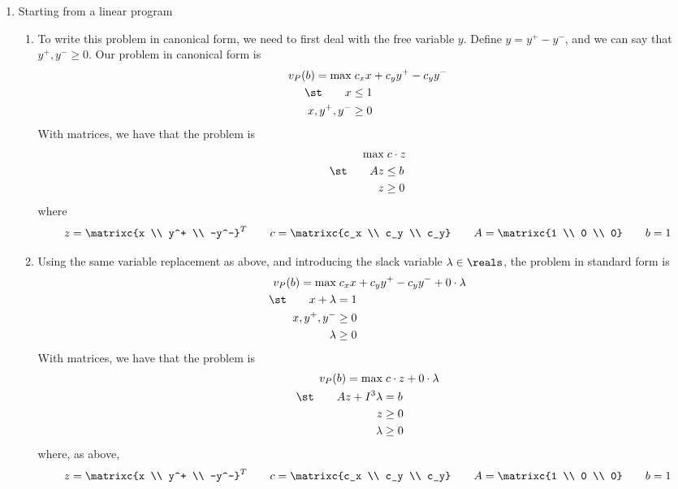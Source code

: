 \documentclass[10pt]{article}
\begin{document}
\begin{enumerate}
	\item Starting from a linear program \begin{enumerate} \item To write this problem in canonical form, we need to first deal with the free variable $y$. Define $y = y^+ - y^-$, and we can say that $y^+ ,y^- \ge 0$. Our problem in canonical form is \begin{align*}v_P(b)= \max &\; c_x x + c_y y^+ - c_y y^- \\ \st \qquad x &\le 1 \\ x,y^+,y^- &\ge 0 \end{align*} With matrices, we have that the problem is \begin{align*} \max &\; c \cdot z \\ \st \qquad Az &\le b \\ z &\ge 0 \end{align*} where \[z = \matrixc{x \\ y^+ \\ -y^-}^T \qquad c = \matrixc{c_x \\ c_y \\ c_y} \qquad  A = \matrixc{1 \\ 0 \\ 0} \qquad b = 1 \] \item Using the same variable replacement as above, and introducing the slack variable $\lambda \in \reals$, the problem in standard form is \begin{align*} v_P(b) = \max &\;c_xx+c_yy^+ - c_yy^- + 0 \cdot \lambda \\ \st \qquad x + \lambda &= 1 \\ x,y^+,y^- &\ge 0 \\ \lambda &\ge 0 \end{align*} With matrices, we have that the problem is \begin{align*} v_P(b) = \max &\; c \cdot z + 0 \cdot \lambda \\ \st \qquad Az + I^3 \lambda &= b \\ z&\ge 0 \\ \lambda &\ge 0 \end{align*} where, as above, \[ z = \matrixc{x \\ y^+ \\ -y^-}^T \qquad c = \matrixc{c_x \\ c_y \\ c_y} \qquad  A = \matrixc{1 \\ 0 \\ 0} \qquad b = 1 \]  \end{enumerate}

\end{enumerate}
\end{document}

